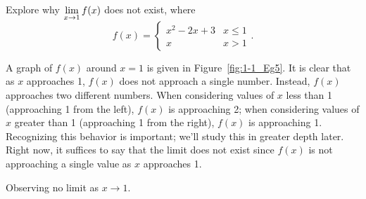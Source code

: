 \begin{example} \label{Ex:1.1.Eg5}
Explore why $\displaystyle \lim_{x\to 1} f(x)$ does not exist, where 
\[ f(x) = \left\{ \begin{array}{cl} x^2-2x+3 & x\leq 1 \\ x & x>1 \end{array} \right..\]

\solution A graph of $f(x)$ around $x=1$ is given in Figure~\ref{fig:1-1_Eg5}. It is clear that as $x$ approaches 1, $f(x)$ does not approach a single number. Instead, $f(x)$ approaches two different numbers. When considering values of $x$ less than 1 (approaching 1 from the left), $f(x)$ is approaching 2; when considering values of $x$ greater than 1 (approaching 1 from the right), $f(x)$ is approaching 1. Recognizing this behavior is important; we'll study this in greater depth later. Right now, it suffices to say that the limit does not exist since $f(x)$ is not approaching a single value as $x$ approaches 1.
\end{example}

\begin{marginfigure}[-8cm]
\caption{Observing no limit as $x\to 1$.}\label{fig:1-1_Eg5}
\end{marginfigure}
